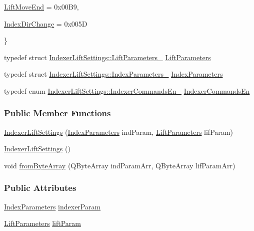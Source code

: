 \begin{DoxyCompactItemize}
\begin{DoxyCompactItemize}
\item\mbox{\hyperlink{classIndexerLiftSettings_a1cdeb18e15c35f26a2979194c6db9452adfe78fdba789cb03023ba4d142e3efab}{Lift\+Move\+End}} = 0x00B9, 
\item\mbox{\hyperlink{classIndexerLiftSettings_a1cdeb18e15c35f26a2979194c6db9452a3a0d3424bd5c37e15efcbf4dbd26bbba}{Index\+Dir\+Change}} = 0x005D
 \end{DoxyCompactItemize}
 \}
\item 
typedef struct \mbox{\hyperlink{structIndexerLiftSettings_1_1LiftParameters__}{Indexer\+Lift\+Settings\+::\+Lift\+Parameters\+\_\+}} \mbox{\hyperlink{classIndexerLiftSettings_a83fd6fc58021bc526b681c1ce840f686}{Lift\+Parameters}}
\item 
typedef struct \mbox{\hyperlink{structIndexerLiftSettings_1_1IndexParameters__}{Indexer\+Lift\+Settings\+::\+Index\+Parameters\+\_\+}} \mbox{\hyperlink{classIndexerLiftSettings_a6b75f15b6abc72b9070642cb8b5408ca}{Index\+Parameters}}
\item 
typedef enum \mbox{\hyperlink{classIndexerLiftSettings_a1cdeb18e15c35f26a2979194c6db9452}{Indexer\+Lift\+Settings\+::\+Indexer\+Commands\+En\+\_\+}} \mbox{\hyperlink{classIndexerLiftSettings_ad0959473f792741cadaa262730f5a463}{Indexer\+Commands\+En}}
\end{DoxyCompactItemize}
\subsubsection*{Public Member Functions}
\begin{DoxyCompactItemize}
\item 
\mbox{\hyperlink{classIndexerLiftSettings_aa334786f67544a57de7253b930eb3528}{Indexer\+Lift\+Settings}} (\mbox{\hyperlink{classIndexerLiftSettings_a6b75f15b6abc72b9070642cb8b5408ca}{Index\+Parameters}} ind\+Param, \mbox{\hyperlink{classIndexerLiftSettings_a83fd6fc58021bc526b681c1ce840f686}{Lift\+Parameters}} lif\+Param)
\item 
\mbox{\hyperlink{classIndexerLiftSettings_ad3adde70e8138f9f775ff9177ce290fe}{Indexer\+Lift\+Settings}} ()
\item 
void \mbox{\hyperlink{classIndexerLiftSettings_ade953aea43325531e7889e71d45d6e65}{from\+Byte\+Array}} (Q\+Byte\+Array ind\+Param\+Arr, Q\+Byte\+Array lif\+Param\+Arr)
\end{DoxyCompactItemize}
\subsubsection*{Public Attributes}
\begin{DoxyCompactItemize}
\item 
\mbox{\hyperlink{classIndexerLiftSettings_a6b75f15b6abc72b9070642cb8b5408ca}{Index\+Parameters}} \mbox{\hyperlink{classIndexerLiftSettings_a09875fa890744d5de30f06b2d580bb24}{indexer\+Param}}
\item 
\mbox{\hyperlink{classIndexerLiftSettings_a83fd6fc58021bc526b681c1ce840f686}{Lift\+Parameters}} \mbox{\hyperlink{classIndexerLiftSettings_ae9649b8642d20d02892fc4abaad687f7}{lift\+Param}}
\end{DoxyCompactItemize}


